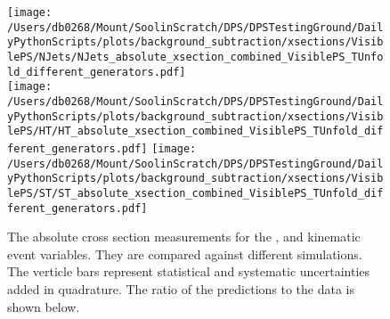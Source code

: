 \begin{figure}[hp]
	\centering
	\texttt{[image: /Users/db0268/Mount/SoolinScratch/DPS/DPSTestingGround/DailyPythonScripts/plots/background\_subtraction/xsections/VisiblePS/NJets/NJets\_absolute\_xsection\_combined\_VisiblePS\_TUnfold\_different\_generators.pdf]} \\
	\texttt{[image: /Users/db0268/Mount/SoolinScratch/DPS/DPSTestingGround/DailyPythonScripts/plots/background\_subtraction/xsections/VisiblePS/HT/HT\_absolute\_xsection\_combined\_VisiblePS\_TUnfold\_different\_generators.pdf]}
	\texttt{[image: /Users/db0268/Mount/SoolinScratch/DPS/DPSTestingGround/DailyPythonScripts/plots/background\_subtraction/xsections/VisiblePS/ST/ST\_absolute\_xsection\_combined\_VisiblePS\_TUnfold\_different\_generators.pdf]} \\
	\caption[The absolute cross section measurements for the \NJET{}, \HT{} and \ST{} kinematic event variables. They are compared against different \ttbar{} simulations. The verticle bars represent statistical and systematic uncertainties added in quadrature. The ratio of the predictions to the data is shown below.]{The absolute cross section measurements for the \NJET{}, \HT{} and \ST{} kinematic event variables. They are compared against different \ttbar{} simulations. The verticle bars represent statistical and systematic uncertainties added in quadrature. The ratio of the predictions to the data is shown below.}
	\label{fig:combXSecAbs1}
\end{figure}
